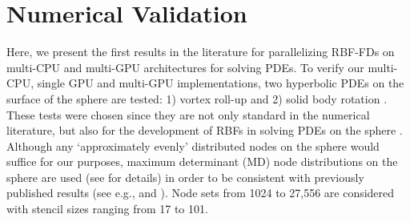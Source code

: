 \documentclass{report}
\begin{document}
\fi

\chapter{Numerical Validation} 

\label{chap:explicit_implicit_pdes}



%
%
%
%

%
%




Here, we present the first results in the literature for parallelizing RBF-FDs on multi-CPU and multi-GPU architectures for solving PDEs. 
 To verify our multi-CPU, single GPU and multi-GPU implementations, two hyperbolic PDEs on the surface of the sphere are tested: 1) vortex roll-up \cite{NairTransport05, NairJablonowski08} and 2) solid body rotation \cite{JakobChien1995}. These tests were chosen since they are not only standard in the numerical literature, but also
for the development of RBFs in solving PDEs on the sphere \cite{FlyerWright07, Fornberg2008, FlyerLehto10, Fornberg2011a}. Although any `approximately evenly' distributed nodes on the sphere would suffice for our purposes, maximum determinant (MD) node distributions on the sphere are used (see \cite{Sloan2003} for details) in order to be consistent with previously published results (see e.g., \cite{FlyerWright07} and \cite{FornbergLehto11}). Node sets from 1024 to 27,556 are considered with stencil sizes ranging from 17 to 101.
\end{document}
